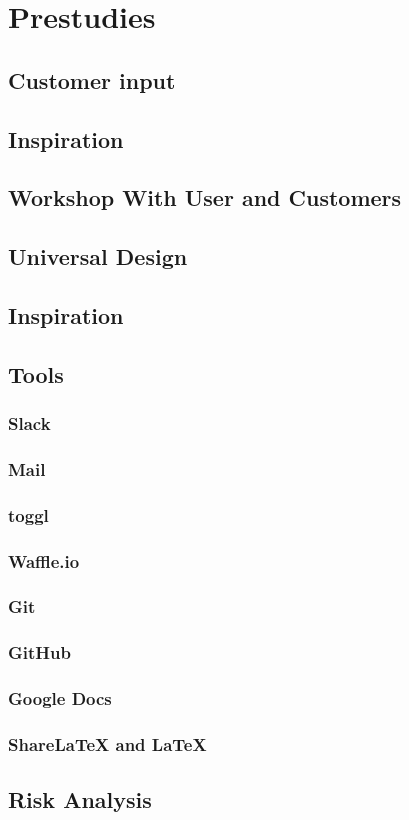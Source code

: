 
\chapter{Prestudies}

\section{Customer input}

\section{Inspiration}

\section{Workshop With User and Customers }

\section{Universal Design}

\section{Inspiration}

\section{Tools}
\subsection{Slack}
\subsection{Mail}
\subsection{toggl}
\subsection{Waffle.io}
\subsection{Git}
\subsection{GitHub}
\subsection{Google Docs}
\subsection{ShareLaTeX and LaTeX}
\subsection{}

\section{Risk Analysis}

\cleardoublepage
